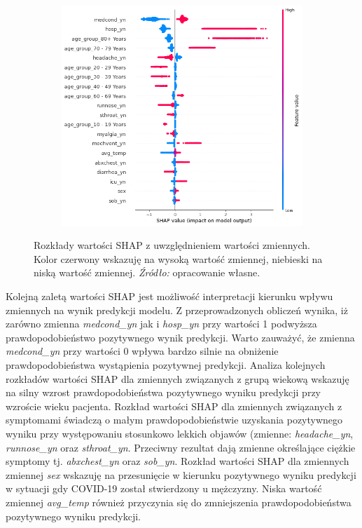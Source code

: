 \documentclass[polish, twoside, 12pt, a4paper]{article}
\theoremstyle{definition}
\theoremstyle{plain}
\theoremstyle{remark}
\begin{document}
\begin{figure}[H]
  \centering
  \begin{subfigure}[t]{\textwidth}
	\centering
    \includegraphics[width=15cm]{shap_summary.png}
  \end{subfigure}
  \captionsetup{margin=10pt,font=small,labelfont=bf,width=.8\textwidth}
  \caption{Rozkłady wartości SHAP z uwzględnieniem wartości zmiennych. Kolor czerwony wskazuję na wysoką wartość zmiennej, niebieski na niską wartość zmiennej. \textit{Źródło:} opracowanie własne.}
\end{figure}

Kolejną zaletą wartości SHAP jest możliwość interpretacji kierunku wpływu zmiennych na wynik predykcji modelu. Z przeprowadzonych obliczeń wynika, iż zarówno zmienna \emph{medcond\_yn} jak i \emph{hosp\_yn} przy wartości 1 podwyższa prawdopodobieństwo pozytywnego wynik predykcji. Warto zauważyć, że zmienna \emph{medcond\_yn} przy wartości 0 wpływa bardzo silnie na obniżenie prawdopodobieństwa wystąpienia pozytywnej predykcji. Analiza kolejnych rozkładów wartości SHAP dla zmiennych związanych z grupą wiekową wskazuję na silny wzrost prawdopodobieństwa pozytywnego wyniku predykcji przy wzroście wieku pacjenta. Rozkład wartości SHAP dla zmiennych związanych z symptomami świadczą o małym prawdopodobieństwie uzyskania pozytywnego wyniku przy występowaniu stosunkowo lekkich objawów (zmienne: \emph{headache\_yn}, \emph{runnose\_yn} oraz \emph{sthroat\_yn}. Przeciwny rezultat dają zmienne określające ciężkie symptomy tj. \emph{abxchest\_yn} oraz \emph{sob\_yn}. Rozkład wartości SHAP dla zmiennych zmiennej \emph{sex} wskazuję na przesunięcie w kierunku pozytywnego wyniku predykcji w sytuacji gdy COVID-19 został stwierdzony u mężczyzny. Niska wartość zmiennej \emph{avg\_temp} również przyczynia się do zmniejszenia prawdopodobieństwa pozytywnego wyniku predykcji. 
\end{document}
